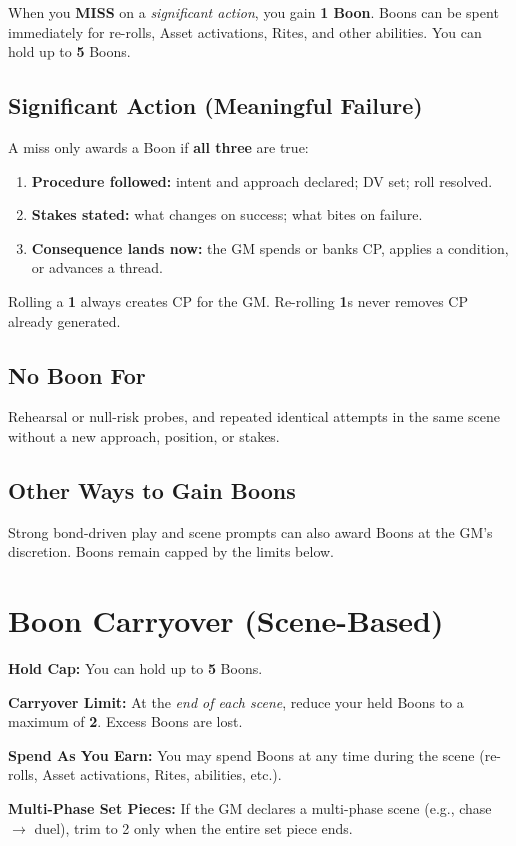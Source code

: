 When you \textbf{MISS} on a \emph{significant action}, you gain \textbf{1 Boon}. Boons can be spent immediately for re-rolls, Asset activations, Rites, and other abilities. You can hold up to \textbf{5} Boons.

\subsection*{Significant Action (Meaningful Failure)}
A miss only awards a Boon if \textbf{all three} are true:
\begin{enumerate}
  \item \textbf{Procedure followed:} intent and approach declared; DV set; roll resolved.
  \item \textbf{Stakes stated:} what changes on success; what bites on failure.
  \item \textbf{Consequence lands now:} the GM spends or banks CP, applies a condition, or advances a thread.
\end{enumerate}
\noindent Rolling a \textbf{1} always creates CP for the GM. Re-rolling \textbf{1}s never removes CP already generated.

\subsection*{No Boon For}
Rehearsal or null-risk probes, and repeated identical attempts in the same scene without a new approach, position, or stakes.

\subsection*{Other Ways to Gain Boons}
Strong bond-driven play and scene prompts can also award Boons at the GM's discretion. Boons remain capped by the limits below.

\section{Boon Carryover (Scene-Based)}
\textbf{Hold Cap:} You can hold up to \textbf{5} Boons.

\textbf{Carryover Limit:} At the \emph{end of each scene}, reduce your held Boons to a maximum of \textbf{2}. Excess Boons are lost.

\textbf{Spend As You Earn:} You may spend Boons at any time during the scene (re-rolls, Asset activations, Rites, abilities, etc.).

\textbf{Multi-Phase Set Pieces:} If the GM declares a multi-phase scene (e.g., chase $\rightarrow$ duel), trim to 2 only when the entire set piece ends.

